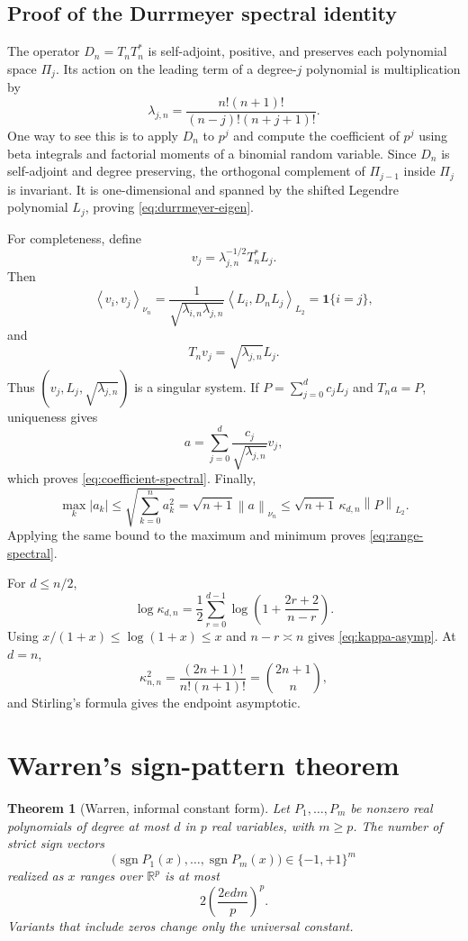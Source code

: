 \documentclass[11pt]{article}
\newtheorem{theorem}{Theorem}[section]
\newcommand{\R}{\mathbb R}
\newcommand{\one}{\mathbf 1}
\newcommand{\sgn}{\operatorname{sgn}}
\newcommand{\norm}[1]{\left\lVert#1\right\rVert}
\newcommand{\inner}[2]{\left\langle#1,#2\right\rangle}
\begin{document}
\subsection{Proof of the Durrmeyer spectral identity}
\label{app:durrmeyer}

The operator $D_n=T_nT_n^*$ is self-adjoint, positive, and preserves each polynomial space $\Pi_j$.  Its action on the leading term of a degree-$j$ polynomial is multiplication by
\[
\lambda_{j,n}
=
\frac{n!(n+1)!}{(n-j)!(n+j+1)!}.
\]
One way to see this is to apply $D_n$ to $p^j$ and compute the coefficient of $p^j$ using beta integrals and factorial moments of a binomial random variable.  Since $D_n$ is self-adjoint and degree preserving, the orthogonal complement of $\Pi_{j-1}$ inside $\Pi_j$ is invariant.  It is one-dimensional and spanned by the shifted Legendre polynomial $L_j$, proving \eqref{eq:durrmeyer-eigen}.

For completeness, define
\[
v_j=\lambda_{j,n}^{-1/2}T_n^*L_j.
\]
Then
\[
\inner{v_i}{v_j}_{\nu_n}
=
\frac{1}{\sqrt{\lambda_{i,n}\lambda_{j,n}}}
\inner{L_i}{D_nL_j}_{L_2}
=\one\{i=j\},
\]
and
\[
T_nv_j=\sqrt{\lambda_{j,n}}L_j.
\]
Thus $(v_j,L_j,\sqrt{\lambda_{j,n}})$ is a singular system.  If $P=\sum_{j=0}^dc_jL_j$ and $T_na=P$, uniqueness gives
\[
a=\sum_{j=0}^d\frac{c_j}{\sqrt{\lambda_{j,n}}}v_j,
\]
which proves \eqref{eq:coefficient-spectral}.  Finally,
\[
\max_k|a_k|
\le
\sqrt{\sum_{k=0}^na_k^2}
=
\sqrt{n+1}\norm a_{\nu_n}
\le
\sqrt{n+1}\,\kappa_{d,n}\norm P_{L_2}.
\]
Applying the same bound to the maximum and minimum proves \eqref{eq:range-spectral}.

For $d\le n/2$,
\[
\log\kappa_{d,n}
=\frac12\sum_{r=0}^{d-1}
\log\left(1+\frac{2r+2}{n-r}\right).
\]
Using $x/(1+x)\le\log(1+x)\le x$ and $n-r\asymp n$ gives \eqref{eq:kappa-asymp}.  At $d=n$,
\[
\kappa_{n,n}^2
=\frac{(2n+1)!}{n!(n+1)!}
=\binom{2n+1}{n},
\]
and Stirling's formula gives the endpoint asymptotic.

\section{Warren's sign-pattern theorem}
\label{app:warren}

\begin{theorem}[Warren, informal constant form]
Let $P_1,\dots,P_m$ be nonzero real polynomials of degree at most $d$ in $p$ real variables, with $m\ge p$.  The number of strict sign vectors
\[
\bigl(\sgn P_1(x),\dots,\sgn P_m(x)\bigr)\in\{-1,+1\}^m
\]
realized as $x$ ranges over $\R^p$ is at most
\[
2\left(\frac{2edm}{p}\right)^p.
\]
Variants that include zeros change only the universal constant.
\end{theorem}
\end{document}
